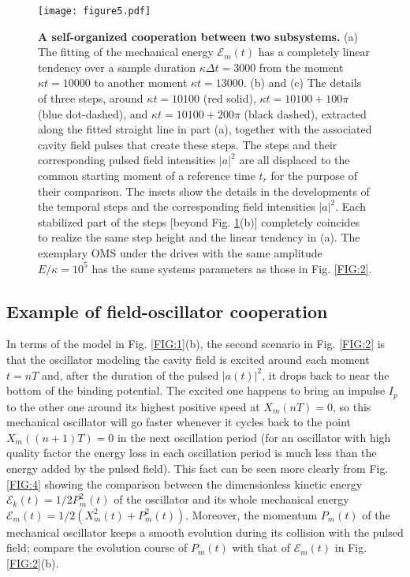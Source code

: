 \documentclass[a4paper,fleqn]{cas-dc}
\begin{document}
\begin{figure}
	\centering
		\texttt{[image: figure5.pdf]}
	\caption{{\bf A self-organized cooperation between two subsystems.} (a) The fitting of the mechanical energy $\mathcal{E}_m(t)$ has a completely linear tendency over a sample duration $\kappa\Delta t=3000$ from the moment $\kappa t=10000$ to another moment $\kappa t=13000$. (b) and (c) The details of three steps, around $\kappa t=10100$ (red solid), $\kappa t=10100+100\pi$ (blue dot-dashed), and $\kappa t=10100+200\pi$ (black dashed), extracted along the fitted straight line in part (a), together with the associated cavity field pulses that create these steps. The steps and their corresponding pulsed field intensities $|a|^2$ are all displaced to the common starting moment of a reference time $t_r$ for the purpose of their comparison. The insets show the details in the developments of the temporal steps and the corresponding field intensities $|a|^2$. Each stabilized part of the steps [beyond Fig. \ref{FIG:5}(b)] completely coincides to realize the same step height and the linear tendency in (a). The exemplary OMS under the drives with the same amplitude $E/\kappa=10^5$ has the same systems parameters as those in Fig. \ref{FIG:2}.}
	\label{FIG:5}
\end{figure}

\subsection{Example of field-oscillator cooperation}
In terms of the model in Fig. \ref{FIG:1}(b), the second scenario in Fig. \ref{FIG:2} is that the oscillator modeling the cavity field is excited around each moment $t=nT$ and, after the duration of the pulsed $|a(t)|^2$, it drops back to near the bottom of the binding potential. The excited one happens to bring an impulse $I_p$ to the other one around its highest positive speed at $X_m(nT)=0$, so this mechanical oscillator will go faster whenever it cycles back to the point $X_m((n+1)T)=0$ in the next oscillation period (for an oscillator with high quality factor the energy loss in each oscillation period is much less than the energy added by the pulsed field). This fact can be seen more clearly from Fig. \ref{FIG:4} showing the comparison between the dimensionless kinetic energy $\mathcal{E}_k(t)=1/2P_m^2(t)$ of the oscillator and its whole mechanical energy $\mathcal{E}_m(t)=1/2\left(X_m^2(t)+P_m^2(t)\right)$. Moreover, the momentum $P_m(t)$ of the mechanical oscillator keeps a smooth evolution during its collision with the pulsed field; compare the evolution course of $P_m(t)$ with that of $\mathcal{E}_m(t)$ 
in Fig. \ref{FIG:2}(b). 
\end{document}
